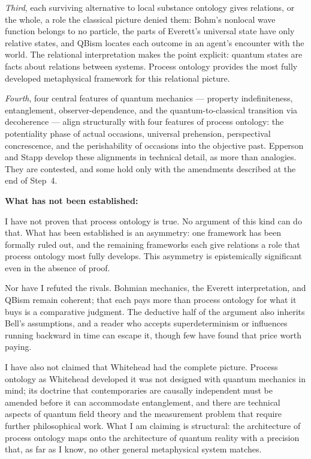 \emph{Third}, each surviving alternative to local substance ontology gives
relations, or the whole, a role the classical picture denied them: Bohm's
nonlocal wave function belongs to no particle, the parts of Everett's universal
state have only relative states, and QBism locates each outcome in an agent's
encounter with the world.
The relational interpretation makes the point explicit: quantum states are facts
about relations between systems.
Process ontology provides the most fully developed metaphysical framework for this
relational picture.

\emph{Fourth}, four central features of quantum mechanics --- property indefiniteness,
entanglement, observer-dependence, and the quantum-to-classical transition via
decoherence --- align structurally with four features of process
ontology: the potentiality phase of actual occasions, universal prehension,
perspectival concrescence, and the perishability of occasions into the objective
past.
Epperson and Stapp develop these alignments in technical detail, as more than
analogies.
They are contested, and some hold only with the amendments described at the end
of Step~4.

\textbf{What has not been established:}

I have not proven that process ontology is true.
No argument of this kind can do that.
What has been established is an asymmetry: one framework has been formally ruled
out, and the remaining frameworks each give relations a role that process
ontology most fully develops.
This asymmetry is epistemically significant even in the absence of proof.

Nor have I refuted the rivals.
Bohmian mechanics, the Everett interpretation, and QBism remain coherent; that
each pays more than process ontology for what it buys is a comparative judgment.
The deductive half of the argument also inherits Bell's assumptions, and a reader
who accepts superdeterminism or influences running backward in time can escape
it, though few have found that price worth paying.

I have also not claimed that Whitehead had the complete picture.
Process ontology as Whitehead developed it was not designed with quantum mechanics
in mind; its doctrine that contemporaries are causally independent must be
amended before it can accommodate entanglement, and there are technical aspects
of quantum field theory and the measurement problem that require further
philosophical work.
What I am claiming is structural: the architecture of process ontology maps onto
the architecture of quantum reality with a precision that, as far as I know, no
other general metaphysical system matches.

